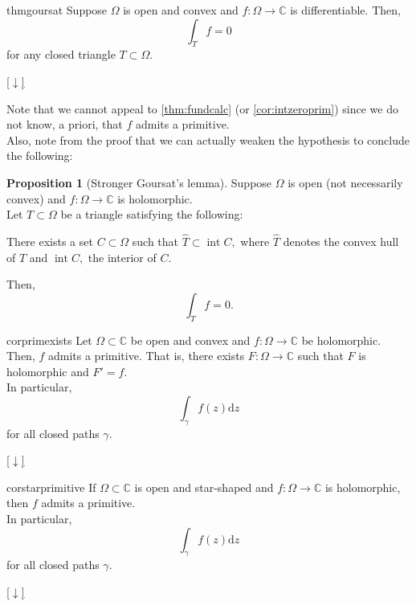 \documentclass[12pt,oneside]{book}
\theoremstyle{definition}
\numberwithin{thm}{chapter}
\newtheorem{prop}[thm]{Proposition}
\newcommand{\downsym}{[$\downarrow$]}
\begin{document}
\begin{restatable}{thm}{goursat}
\label{thm:goursat}
	Suppose $\Omega$ is open and convex and $f:\Omega\to\mathbb{C}$ is differentiable. Then, 
	\begin{equation*} 
		\int_T f = 0
	\end{equation*}
	for any closed triangle $T \subset \Omega.$
\end{restatable}
\begin{flushright}\hyperref[thm:goursat2]{\downsym}\end{flushright}
Note that we cannot appeal to \cref{thm:fundcalc} (or \cref{cor:intzeroprim}) since we do not know, a priori, that $f$ admits a primitive.\\
Also, note from the proof that we can actually weaken the hypothesis to conclude the following:
\begin{prop}[Stronger Goursat's lemma]\label{prop:stronkgours}
	Suppose $\Omega$ is open (not necessarily convex) and $f:\Omega \to \mathbb{C}$ is holomorphic.\\
	Let $T \subset \Omega$ be a triangle satisfying the following:

	There exists a set $C \subset \Omega$ such that $\widehat{T} \subset \operatorname{int} C,$ where $\widehat{T}$ denotes the convex hull of $T$ and $\operatorname{int} C,$ the interior of $C.$

	Then, 
	\begin{equation*} 
		\int_T f = 0.
	\end{equation*}
\end{prop} 

\begin{restatable}{cor}{primexists}
\label{cor:primexists}
	Let $\Omega \subset \mathbb{C}$ be open and convex and $f:\Omega \to \mathbb{C}$ be holomorphic. Then, $f$ admits a primitive. That is, there exists $F:\Omega \to \mathbb{C}$ such that $F$ is holomorphic and $F' = f.$\\
	In particular, 
	\begin{equation*} 
		\int_{\gamma}^{} f(z) \mathrm{d}z
	\end{equation*}
	for all closed paths $\gamma.$
\end{restatable}
\begin{flushright}\hyperref[cor:primexists2]{\downsym}\end{flushright}

\begin{restatable}{cor}{starprimitive}
\label{cor:starprimitive}
	If $\Omega \subset \mathbb{C}$ is open and star-shaped and $f:\Omega \to \mathbb{C}$ is holomorphic, then $f$ admits a primitive.\\
	In particular, 
	\begin{equation*} 
		\int_{\gamma}^{} f(z) \mathrm{d}z
	\end{equation*}
	for all closed paths $\gamma.$
\end{restatable}
\begin{flushright}\hyperref[cor:starprimitive2]{\downsym}\end{flushright}
\end{document}
